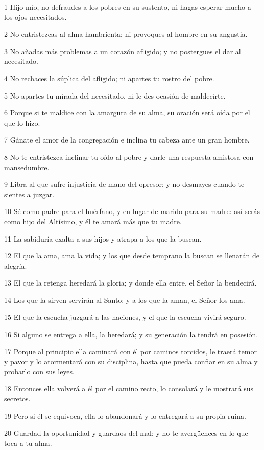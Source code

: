 \par 1 Hijo mío, no defraudes a los pobres en su sustento, ni hagas esperar mucho a los ojos necesitados.
\par 2 No entristezcas al alma hambrienta; ni provoques al hombre en su angustia.
\par 3 No añadas más problemas a un corazón afligido; y no postergues el dar al necesitado.
\par 4 No rechaces la súplica del afligido; ni apartes tu rostro del pobre.
\par 5 No apartes tu mirada del necesitado, ni le des ocasión de maldecirte.
\par 6 Porque si te maldice con la amargura de su alma, su oración será oída por el que lo hizo.
\par 7 Gánate el amor de la congregación e inclina tu cabeza ante un gran hombre.
\par 8 No te entristezca inclinar tu oído al pobre y darle una respuesta amistosa con mansedumbre.
\par 9 Libra al que sufre injusticia de mano del opresor; y no desmayes cuando te sientes a juzgar.
\par 10 Sé como padre para el huérfano, y en lugar de marido para su madre: así serás como hijo del Altísimo, y él te amará más que tu madre.
\par 11 La sabiduría exalta a sus hijos y atrapa a los que la buscan.
\par 12 El que la ama, ama la vida; y los que desde temprano la buscan se llenarán de alegría.
\par 13 El que la retenga heredará la gloria; y donde ella entre, el Señor la bendecirá.
\par 14 Los que la sirven servirán al Santo; y a los que la aman, el Señor los ama.
\par 15 El que la escucha juzgará a las naciones, y el que la escucha vivirá seguro.
\par 16 Si alguno se entrega a ella, la heredará; y su generación la tendrá en posesión.
\par 17 Porque al principio ella caminará con él por caminos torcidos, le traerá temor y pavor y lo atormentará con su disciplina, hasta que pueda confiar en su alma y probarlo con sus leyes.
\par 18 Entonces ella volverá a él por el camino recto, lo consolará y le mostrará sus secretos.
\par 19 Pero si él se equivoca, ella lo abandonará y lo entregará a su propia ruina.
\par 20 Guardad la oportunidad y guardaos del mal; y no te avergüences en lo que toca a tu alma.
